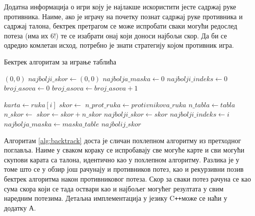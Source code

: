 \documentclass[a4paper, 12pt, ngerman]{article}
\newcommand{\cpp}{C\texttt{++}}
\begin{document}
Додатна информација о игри коју је најлакше искористити јесте садржај руке противника. Наиме, ако је играчу на почетку познат садржај руке противника и садржај талона, бектрек претрагом се може испробати сваки могући редослед потеза (има их $6!$) те се изабрати онај који доноси најбољи скор. Да би се одредио комлетан исход, потребно је знати стратегију којом противник игра. 


\begin{algorithm}[htbp]
	\caption{Бектрек алгоритам за играње таблића}
	\label{alg:backtrack}
	\begin{algorithmic}
				\State\Return $(0, 0)$
			\EndIf
	\State $najbolji\_skor \gets (0, 0)$
	\State $najbolja\_maska \gets 0$
	\State $najbolji\_indeks \gets 0$
	\State $broj\_asova \gets 0$
			\State $broj\_asova \gets broj\_asova + 1$
		\EndIf
	\EndFor
	
				\State $karta \gets ruka[i]$
				\State $skor \gets$ 
				\State $n\_prot\_ruka \gets protivnikova\_ruka$
				\State $n\_tabla \gets tabla$
				\State{}
				\State $n\_skor \gets$
				\State $skor \gets skor + n\_skor$
					\State $najbolji\_skor \gets skor$
					\State $najbolji\_indeks \gets i$
					\State $najbolja\_maska \gets maska\_table$
				\EndIf
			\EndFor
		\EndFor	
	\EndFor
	\State{}
	\State\Return $najbolij\_skor$
	\EndFunction
\end{algorithmic}
\end{algorithm}

Алгоритам \ref{alg:backtrack} доста је сличан похлепном алгоритму из претходног поглавља. Наиме у сваком кораку се испробавају све могуће карте и сви могући скупови карата са талона, идентично као у похлепном алгоритму. Разлика је у томе што се у обзир још рачунају и противников потез, као и рекурзивни позив бектрек алгоритма након противниковог потеза. Скор за сваки потез рачуна се као сума скора који се тада оствари као и најбољег могућег резултата у свим наредним потезима. Детаљна имплементација у језику \cpp може се наћи у додатку А.
\end{document}
